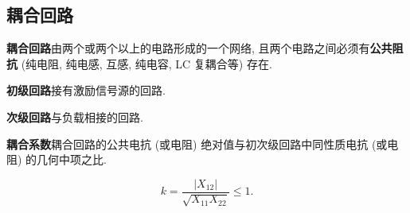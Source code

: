 \subsection{耦合回路}

\textbf{耦合回路}\quad 由两个或两个以上的电路形成的一个网络, 且两个电路之间必须有\textbf{公共阻抗} (纯电阻, 纯电感, 互感, 纯电容, LC 复耦合等) 存在.

\textbf{初级回路}\quad 接有激励信号源的回路.

\textbf{次级回路}\quad 与负载相接的回路.

\textbf{耦合系数}\quad 耦合回路的公共电抗 (或电阻) 绝对值与初次级回路中同性质电抗 (或电阻) 的几何中项之比.

\begin{equation}
    k=\frac{|X_{12}|}{\sqrt{X_{11}X_{22}}}\leq 1.
\end{equation}
